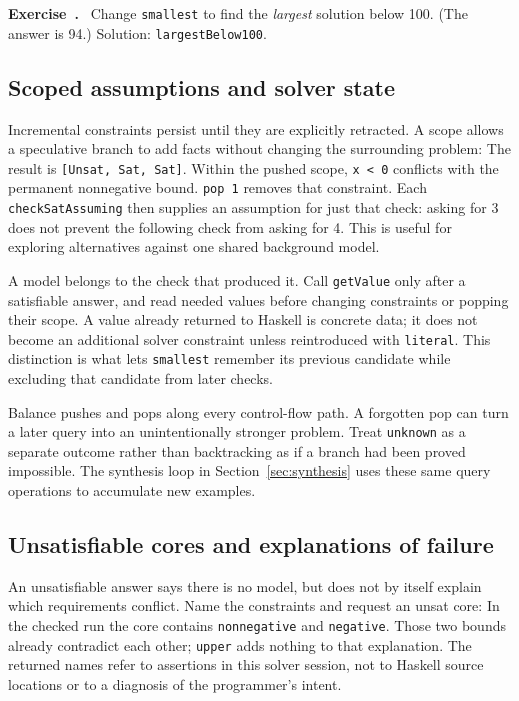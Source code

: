 \documentclass[review]{jfp-epi}
\newcommand{\code}[1]{\texttt{#1}}
\newcounter{exercise}
\newenvironment{exercise}{\refstepcounter{exercise}\par\medskip\noindent
  \textbf{Exercise~\theexercise.}\ }{\par\medskip}
\begin{document}
\begin{exercise}
Change \code{smallest} to find the \emph{largest} solution below 100. (The answer
is 94.) Solution: \code{largestBelow100}.
\end{exercise}




\subsection{Scoped assumptions and solver state}
\label{sec:scoped-assumptions}

Incremental constraints persist until they are explicitly retracted. A scope
allows a speculative branch to add facts without changing the surrounding
problem:
The result is \code{[Unsat, Sat, Sat]}. Within the pushed scope, \code{x < 0}
conflicts with the permanent nonnegative bound. \code{pop 1} removes that
constraint. Each \code{checkSatAssuming} then supplies an assumption for just
that check: asking for 3 does not prevent the following check from asking for 4.
This is useful for exploring alternatives against one shared background model.

A model belongs to the check that produced it. Call \code{getValue} only after
a satisfiable answer, and read needed values before changing constraints or
popping their scope. A value already returned to Haskell is concrete data; it
does not become an additional solver constraint unless reintroduced with
\code{literal}. This distinction is what lets \code{smallest} remember its
previous candidate while excluding that candidate from later checks.

Balance pushes and pops along every control-flow path. A forgotten pop can
turn a later query into an unintentionally stronger problem. Treat \code{unknown}
as a separate outcome rather than backtracking as if a branch had been proved
impossible. The synthesis loop in Section~\ref{sec:synthesis} uses these same
query operations to accumulate new examples.


\subsection{Unsatisfiable cores and explanations of failure}
\label{sec:unsat-cores}

An unsatisfiable answer says there is no model, but does not by itself explain
which requirements conflict. Name the constraints and request an unsat core:
In the checked run the core contains \code{nonnegative} and \code{negative}.
Those two bounds already contradict each other; \code{upper} adds nothing to
that explanation. The returned names refer to assertions in this solver session,
not to Haskell source locations or to a diagnosis of the programmer's intent.
\end{document}
